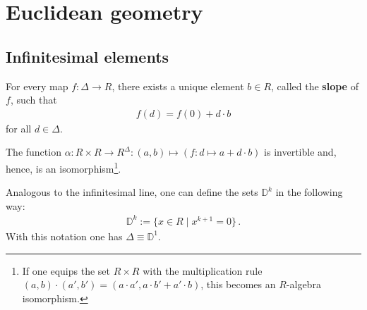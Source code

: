 
\section{Euclidean geometry}
\subsection{Infinitesimal elements}


    \begin{axiom}\label{synth:kock_lawvere_axiom}
        For every map $f:\Delta\rightarrow R$, there exists a unique element $b\in R$, called the \textbf{slope} of $f$, such that
        \begin{gather}
            f(d) = f(0) + d\cdot b
        \end{gather}
        for all $d\in\Delta$.
    \end{axiom}
    \begin{result}
        The function $\alpha:R\times R\rightarrow  R^\Delta:(a,b)\mapsto(f:d\mapsto a+d\cdot b)$ is invertible and, hence, is an isomorphism\footnote{If one equips the set $R\times R$ with the multiplication rule $(a,b)\cdot(a',b') = (a\cdot a',a\cdot b' + a'\cdot b)$, this becomes an $R$-algebra isomorphism.}.
    \end{result}

    \begin{notation}
        Analogous to the infinitesimal line, one can define the sets $\mathbb{D}^k$ in the following way:
        \begin{gather}
            \mathbb{D}^k := \{x\in R\mid x^{k+1}=0\}\,.
        \end{gather}
        With this notation one has $\Delta\equiv\mathbb{D}^1$.
    \end{notation}

